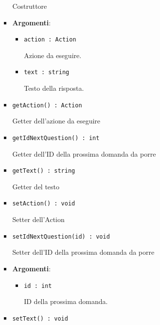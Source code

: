\documentclass[../DefinizioneDiProdotto.tex]{subfiles}
\begin{document}
\begin{itemize}
\begin{itemize}
\begin{itemize}
	 Costruttore

	\item \textbf{Argomenti}:
	\begin{itemize}
	\item \texttt{action : Action}\

	 Azione da eseguire.
	\item \texttt{text : string}\

	 Testo della risposta.
	\end{itemize}
	\end{itemize}\vspace{0.5em}
	\begin{itemize}
	\item \texttt{getAction() : Action}\

	 Getter dell'azione da eseguire
	\end{itemize}\vspace{0.5em}
	\begin{itemize}
	\item \texttt{getIdNextQuestion() : int}\

	 Getter dell'ID della prossima domanda da porre
	\end{itemize}\vspace{0.5em}
	\begin{itemize}
	\item \texttt{getText() : string}\

	 Getter del testo
	\end{itemize}\vspace{0.5em}
	\begin{itemize}
	\item \texttt{setAction() : void}\

	 Setter dell'Action
	\end{itemize}\vspace{0.5em}
	\begin{itemize}
	\item \texttt{setIdNextQuestion(id) : void}\

	 Setter dell'ID della prossima domanda da porre

	\item \textbf{Argomenti}:
	\begin{itemize}
	\item \texttt{id : int}\

	 ID della prossima domanda.
	\end{itemize}
	\end{itemize}\vspace{0.5em}
	\begin{itemize}
	\item \texttt{setText() : void}\


\end{itemize}
\end{itemize}
\end{itemize}
\end{document}
